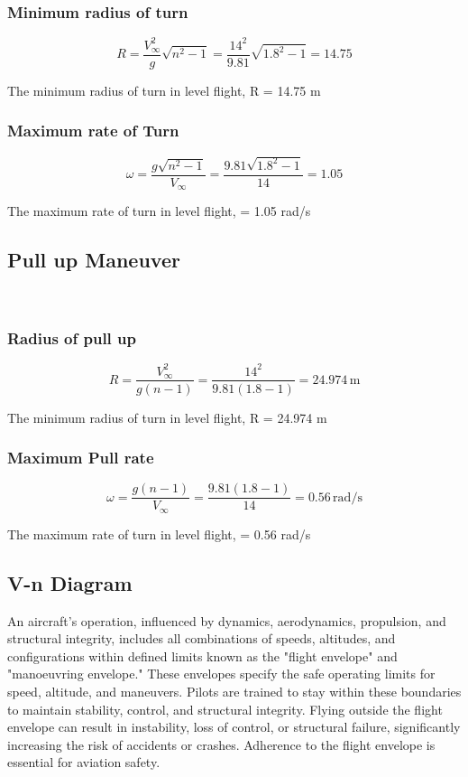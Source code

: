 \documentclass[12 pt]{article}
\begin{document}
{{\subsubsection{Minimum radius of turn}
\[ R = \frac{V_{\infty}^2}{g} \sqrt{n^2 - 1} = \frac{14^2}{9.81} \sqrt{1.8^2 - 1} = 14.75 \]

The minimum radius of turn in level flight, R = 14.75 m

\subsubsection{Maximum rate of Turn}
\[ \omega = \frac{g \sqrt{n^2 - 1}}{V_{\infty}} = \frac{9.81 \sqrt{1.8^2 - 1}}{14} = 1.05 \]

The maximum rate of turn in level flight, \omega = 1.05 rad/s

\subsection{Pull up Maneuver}\\

\subsubsection{Radius of pull up}
\[ R = \frac{V_{\infty}^2}{g (n-1)} = \frac{14^2}{9.81 (1.8 - 1)} = 24.974 \, \text{m} \]

The minimum radius of turn in level flight, R = 24.974 m

\subsubsection{Maximum Pull rate}
\[ \omega = \frac{g (n-1)}{V_{\infty}} = \frac{9.81 (1.8 - 1)}{14} = 0.56 \, \text{rad/s} \]

The maximum rate of turn in level flight, \omega = 0.56 rad/s

\subsection{V-n Diagram}
An aircraft’s operation, influenced by dynamics, aerodynamics, propulsion, and structural integrity, includes all combinations of speeds, altitudes, and configurations within defined limits known as the "flight envelope" and "manoeuvring envelope." These envelopes specify the safe operating limits for speed, altitude, and maneuvers. Pilots are trained to stay within these boundaries to maintain stability, control, and structural integrity. Flying outside the flight envelope can result in instability, loss of control, or structural failure, significantly increasing the risk of accidents or crashes. Adherence to the flight envelope is essential for aviation safety.\\

}}
\end{document}
